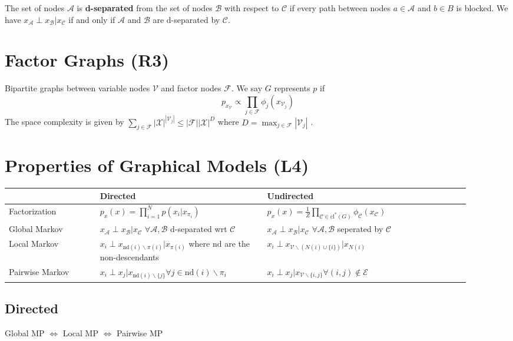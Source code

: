 \documentclass[9pt]{article}
\begin{document}
\begin{multicols}{2}
The set of nodes $\mathcal{A}$ is \textbf{d-separated} from the set of nodes $\mathcal{B}$ with respect to $\mathcal{C}$ if every path between nodes $a \in \mathcal{A}$ and $b \in B$ is blocked. We have $x_\mathcal{A} \perp x_\mathcal{B} | x_\mathcal{C}$  if and only if $\mathcal{A}$ and $\mathcal{B}$ are d-separated by $\mathcal{C}$.

\section{Factor Graphs (R3)}

Bipartite graphs between variable nodes $\mathcal{V}$ and factor nodes $\mathcal{F}$. We say $G$ represents $p$ if $$p_{x_{\mathcal{V}}} \propto \prod_{j \in \mathcal{F}}\phi_{j}(x_{\mathcal{V}_j})$$ The space complexity is given by $\sum_{j  \in \mathcal{F}}|\mathcal{X}|^{|\mathcal{V}_j|} \le |\mathcal{F}|
|\mathcal{X}|^{D}$ where $D=\max_{j \in \mathcal{F}}|\mathcal{V}_j|$
.

\section{Properties of Graphical Models (L4)}

{\small
\begin{tabular}{p{0.18\linewidth}|p{0.33\linewidth}|p{0.4\linewidth}}
      & Directed & Undirected \\
      \hline 
Factorization & $p_{x}(x)=\prod\limits_{i=1}^{N}p(x_i|x_{\pi_i})$  &
$p_{x}(x)=\frac{1}{Z}\prod\limits_{\mathcal{C} \in \text{cl}^*(G)}
\phi_{\mathcal{C}}(x_{\mathcal{C}})$ \\
\hline
Global Markov & $x_{\mathcal{A}} \perp x_{\mathcal{B}} |
x_{\mathcal{C}}$ $\forall \mathcal{A}, \mathcal{B}$ d-separated 
wrt $\mathcal{C}$ & $x_{\mathcal{A}} \perp x_{\mathcal{B}} | x_{\mathcal{C}}$ $\forall \mathcal{A}, \mathcal{B}$ 
seperated by $\mathcal{C}$ \\
\hline Local Markov & $x_i \perp x_{\text{nd}(i)\backslash 
\pi(i)}|x_{\pi(i)}$ where $\text{nd}$ are the non-descendants &
$x_{i} \perp x_{\mathcal{V} \backslash (N(i) \cup \{i\})}| x_{N(i)}$
\\
\hline Pairwise Markov & $x_i \perp x_j | x_{\text{nd}(i) \backslash \{j\}} \forall j \in \text{nd}(i) \backslash \pi_i$ &
$x_i \perp x_j | x_{\mathcal{V} \backslash \{i,j\}} \forall (i,j)
\not\in\mathcal{E}$ 
\end{tabular}
}

\subsection{Directed}
Global MP $\Leftrightarrow$ Local MP
$\Leftrightarrow$ Pairwise MP


\end{multicols}
\end{document}
